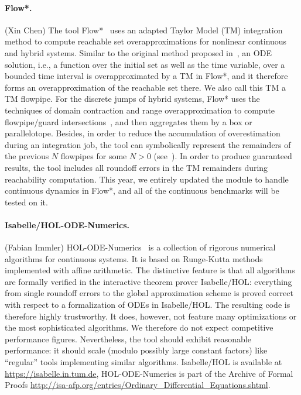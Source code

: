\documentclass[EPiC]{easychair}
\begin{document}
\paragraph{Flow*.} (Xin Chen) The tool Flow*~\cite{Chen+/2013/flowstar,Chen/2015/phd} uses an adapted Taylor Model (TM) integration method to compute reachable set overapproximations for nonlinear continuous and hybrid systems. Similar to the original method proposed in~\cite{Berz+Makino/1998/Verified}, an ODE solution, i.e., a function over the initial set as well as the time variable, over a bounded time interval is overapproximated by a TM in Flow*, and it therefore forms an overapproximation of the reachable set there. We also call this TM a TM flowpipe. For the discrete jumps of hybrid systems, Flow* uses the techniques of domain contraction and range overapproximation to compute flowpipe/guard intersections~\cite{Chen+/2012/taylor_models}, and then aggregates them by a box or parallelotope. Besides, in order to reduce the accumulation of overestimation during an integration job, the tool can symbolically represent the remainders of the previous $N$ flowpipes for some $N > 0$ (see~\cite{Chen+Sankaranarayanan/2016/decomposed}). In order to produce guaranteed results, the tool includes all roundoff errors in the TM remainders during reachability computation. This year, we entirely updated the module to handle continuous dynamics in Flow*, and all of the continuous benchmarks will be tested on it.



\paragraph{Isabelle/HOL-ODE-Numerics.}(Fabian Immler)
HOL-ODE-Numerics~\cite{Immler2015-TACAS,ODE-AFP} is a collection of rigorous numerical algorithms for continuous systems. It is based on Runge-Kutta methods implemented with affine arithmetic. 
The distinctive feature is that all algorithms are formally verified in the interactive
theorem prover Isabelle/HOL: everything from single roundoff errors to the global approximation
scheme is proved correct with respect to a formalization of ODEs in Isabelle/HOL.
The resulting code is therefore highly trustworthy.
It does, however, not feature many optimizations or the most sophisticated algorithms. We therefore
do not expect competitive performance figures. Nevertheless, the tool should exhibit reasonable
performance: it should scale (modulo possibly large constant factors) like ``regular'' tools
implementing similar algorithms. Isabelle/HOL is available at \url{https://isabelle.in.tum.de}, HOL-ODE-Numerics is part of the Archive of Formal Proofs \url{http://isa-afp.org/entries/Ordinary_Differential_Equations.shtml}.
\end{document}
